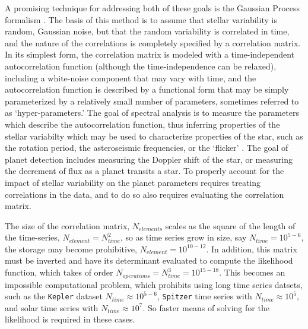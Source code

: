 \documentclass[manuscript, letterpaper]{aastex6}
\begin{document}
A promising technique for addressing both of these goals is the Gaussian Process formalism 
\citep{Rasmussen2006,Gibson2012}.  The basis of this method is to assume that stellar variability
is random, Gaussian noise, but that the random variability is correlated in time, and the nature of the
correlations is completely specified by a correlation matrix.  In its simplest form, the 
correlation matrix is modeled with a time-independent autocorrelation function (although 
the time-independence can be relaxed), including a white-noise component that may vary
with time, and the autocorrelation function is described by a functional form that may be 
simply parameterized by a relatively small number of parameters, sometimes referred to as 
`hyper-parameters.'  The goal of spectral analysis is to measure the parameters which
describe the autocorrelation function, thus inferring properties of the stellar variabilty
which may be used to characterize properties of the star, such as the rotation period,
the asteroseismic frequencies, or the `flicker' \citep{Aerts2010,Noyes1984,Bastien2013}.
The goal of planet detection includes measuring the Doppler shift of the star, or measuring
the decrement of flux as a planet transits a star.  To properly account for the impact of 
stellar variability on the planet parameters requires treating correlations in the data, and 
to do so also requires evaluating the correlation matrix.  

The size of the correlation matrix, $N_{elements}$ scales as the square of the length of the time-series,
$N_{element}=N_{time}^2$, so as time series grow in size, say $N_{time} =10^{5-6}$, the storage may become 
prohibitive, $N_{element} = 10^{10-12}$.  In addition, this matrix must be inverted and have
its determinant evaluated to compute the likelihood function, which takes of order $N_{operations}
= N_{time}^3 = 10^{15-18}$.  This becomes an impossible computational problem, which prohibits
using long time series datsets, such as the \texttt{Kepler} dataset $N_{time} \approx 10^{5-6}$,
\texttt{Spitzer} time series with $N_{time} \approx 10^5$, and solar time series with
$N_{time} \approx 10^7$.  So faster means of solving for the likelihood is required in these
cases.
\end{document}
